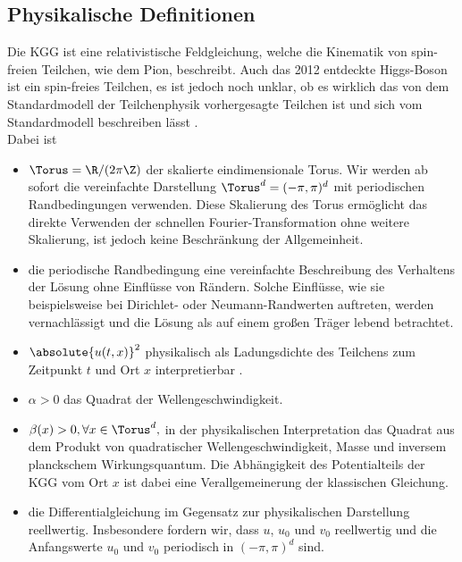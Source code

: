 \subsection{Physikalische Definitionen}
Die KGG ist eine relativistische Feldgleichung, welche die Kinematik von spin-freien Teilchen, wie dem Pion, beschreibt. Auch das 2012 entdeckte Higgs-Boson ist ein spin-freies Teilchen, es ist jedoch noch unklar, ob es wirklich das von dem Standardmodell der Teilchenphysik vorhergesagte Teilchen ist und sich vom Standardmodell beschreiben lässt \autocite{cern2016}.\\
Dabei ist
\begin{itemize}
\item $\Torus=\R/(2\pi\Z)$ der skalierte eindimensionale Torus. Wir werden ab sofort die vereinfachte Darstellung $\Torus^d=(-\pi,\pi)^d$ mit periodischen Randbedingungen verwenden. Diese Skalierung des Torus ermöglicht das direkte Verwenden der schnellen Fourier-Transformation ohne weitere Skalierung, ist jedoch keine Beschränkung der Allgemeinheit. 
\item die periodische Randbedingung eine vereinfachte Beschreibung des Verhaltens der Lösung ohne Einflüsse von Rändern. Solche Einflüsse, wie sie beispielsweise bei Dirichlet- oder Neumann-Randwerten auftreten, werden vernachlässigt und die Lösung als auf einem großen Träger lebend betrachtet.
\item $\absolute{u(t,x)}^2$ physikalisch als Ladungsdichte des Teilchens zum Zeitpunkt $t$ und Ort $x$ interpretierbar \autocite{kleingordon2016}. 
\item $\alpha>0$ das Quadrat der Wellengeschwindigkeit.
\item $\beta(x)>0, \forall x\in \Torus^d,$ in der physikalischen Interpretation das Quadrat aus dem Produkt von quadratischer Wellengeschwindigkeit, Masse und inversem planckschem Wirkungsquantum. Die Abhängigkeit des Potentialteils der KGG vom Ort $x$ ist dabei eine Verallgemeinerung der klassischen Gleichung.
\item die Differentialgleichung im Gegensatz zur physikalischen Darstellung reellwertig. Insbesondere fordern wir, dass $u$, $u_0$ und $v_0$ reellwertig und die Anfangswerte $u_0$ und $v_0$ periodisch in $(-\pi,\pi)^d$ sind. 
\end{itemize}


